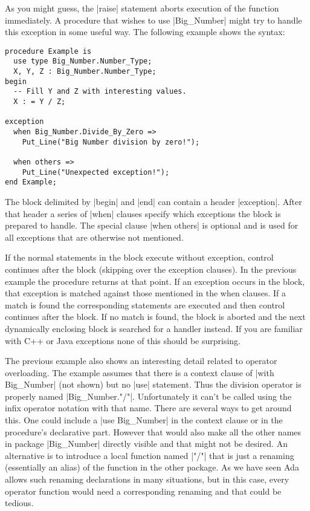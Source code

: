 \noindent As you might guess, the |raise| statement aborts execution of the function
immediately. A procedure that wishes to use |Big_Number| might try to handle this exception in
some useful way. The following example shows the syntax:

\begin{lstlisting}
procedure Example is
  use type Big_Number.Number_Type;
  X, Y, Z : Big_Number.Number_Type;
begin
  -- Fill Y and Z with interesting values.
  X : = Y / Z;

exception
  when Big_Number.Divide_By_Zero =>
    Put_Line("Big Number division by zero!");

  when others =>
    Put_Line("Unexpected exception!");
end Example;
\end{lstlisting}

\noindent The block delimited by |begin| and |end| can contain a header |exception|. After that
header a series of |when| clauses specify which exceptions the block is prepared to handle. The
special clause |when others| is optional and is used for all exceptions that are otherwise not
mentioned.

If the normal statements in the block execute without exception, control continues after the
block (skipping over the exception clauses). In the previous example the procedure returns at
that point. If an exception occurs in the block, that exception is matched against those
mentioned in the when clauses. If a match is found the corresponding statements are executed and
then control continues after the block. If no match is found, the block is aborted and the next
dynamically enclosing block is searched for a handler instead. If you are familiar with C++ or
Java exceptions none of this should be surprising.

The previous example also shows an interesting detail related to operator overloading. The
example assumes that there is a context clause of |with Big_Number| (not shown) but no |use|
statement. Thus the division operator is properly named |Big_Number."/"|. Unfortunately it can't
be called using the infix operator notation with that name. There are several ways to get around
this. One could include a |use Big_Number| in the context clause or in the procedure's
declarative part. However that would also make all the other names in package |Big_Number|
directly visible and that might not be desired. An alternative is to introduce a local function
named |"/"| that is just a renaming (essentially an alias) of the function in the other package.
As we have seen Ada allows such renaming declarations in many situations, but in this case,
every operator function would need a corresponding renaming and that could be tedious.


